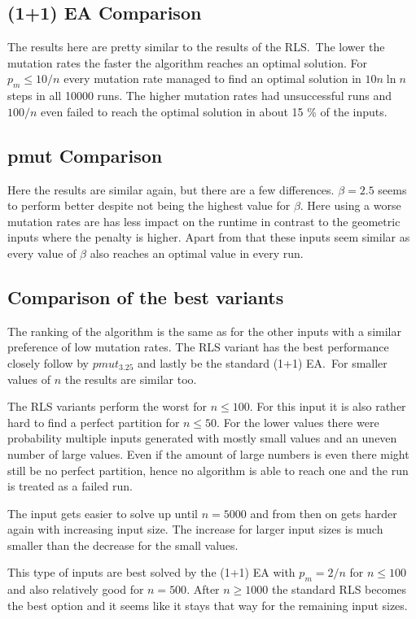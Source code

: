 \subsection{(1+1) EA Comparison}


The results here are pretty similar to the results of the RLS.\
The lower the mutation rates the faster the algorithm reaches an optimal solution.
For $p_m\le10/n$ every mutation rate managed to find an optimal solution in $10n\ln n$ steps in all 10000 runs.
The higher mutation rates had unsuccessful runs and $100/n$ even failed to reach the optimal solution in about 15 \% of the inputs.

\subsection{pmut Comparison}


Here the results are similar again, but there are a few differences.
$\beta=2.5$ seems to perform better despite not being the highest value for $\beta$.
Here using a worse mutation rates are has less impact on the runtime in contrast to the geometric inputs where the penalty is higher.
Apart from that these inputs seem similar as every value of $\beta$ also reaches an optimal value in every run.

\subsection{Comparison of the best variants}
The ranking of the algorithm is the same as for the other inputs with a similar preference of low mutation rates.
The RLS variant has the best performance closely follow by $pmut_{3.25}$ and lastly be the standard (1+1) EA.\
For smaller values of $n$ the results are similar too.


The RLS variants perform the worst for $n\le 100$.
For this input it is also rather hard to find a perfect partition for $n\le50$.
For the lower values there were probability multiple inputs generated with mostly small values and an uneven number of large values.
Even if the amount of large numbers is even there might still be no perfect partition, hence no algorithm is able to reach one and the run is treated as a failed run.



The input gets easier to solve up until $n=5000$ and from then on gets harder again with increasing input size.
The increase for larger input sizes is much smaller than the decrease for the small values.



This type of inputs are best solved by the (1+1) EA with $p_m=2/n$ for $n\le100$ and also relatively good for $n=500$.
After $n\ge1000$ the standard RLS becomes the best option and it seems like it stays that way for the remaining input sizes.
